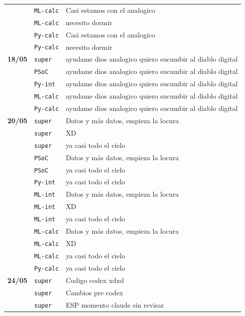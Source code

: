 \begin{longtable}{@{}p{1.7cm} p{1.5cm} p{12.2cm}@{}}
 & \texttt{\scriptsize ML-calc} & Casi estamos con el analogico \\
 & \texttt{\scriptsize ML-calc} & necesito dormir \\
 & \texttt{\scriptsize Py-calc} & Casi estamos con el analogico \\
 & \texttt{\scriptsize Py-calc} & necesito dormir \\
\textbf{18/05} & \texttt{\scriptsize super} & ayudame dios analogico quiero sucumbir al diablo digital \\
 & \texttt{\scriptsize PSoC} & ayudame dios analogico quiero sucumbir al diablo digital \\
 & \texttt{\scriptsize Py-int} & ayudame dios analogico quiero sucumbir al diablo digital \\
 & \texttt{\scriptsize ML-calc} & ayudame dios analogico quiero sucumbir al diablo digital \\
 & \texttt{\scriptsize Py-calc} & ayudame dios analogico quiero sucumbir al diablo digital \\
\textbf{20/05} & \texttt{\scriptsize super} & Datos y más datos, empieza la locura \\
 & \texttt{\scriptsize super} & XD \\
 & \texttt{\scriptsize super} & ya casi todo el cielo \\
 & \texttt{\scriptsize PSoC} & Datos y más datos, empieza la locura \\
 & \texttt{\scriptsize PSoC} & ya casi todo el cielo \\
 & \texttt{\scriptsize Py-int} & ya casi todo el cielo \\
 & \texttt{\scriptsize ML-int} & Datos y más datos, empieza la locura \\
 & \texttt{\scriptsize ML-int} & XD \\
 & \texttt{\scriptsize ML-int} & ya casi todo el cielo \\
 & \texttt{\scriptsize ML-calc} & Datos y más datos, empieza la locura \\
 & \texttt{\scriptsize ML-calc} & XD \\
 & \texttt{\scriptsize ML-calc} & ya casi todo el cielo \\
 & \texttt{\scriptsize Py-calc} & ya casi todo el cielo \\
\textbf{24/05} & \texttt{\scriptsize super} & Codigo codex xdxd \\
 & \texttt{\scriptsize super} & Cambios pre codex \\
 & \texttt{\scriptsize super} & ESP momento claude sin revisar \\

\end{longtable}
